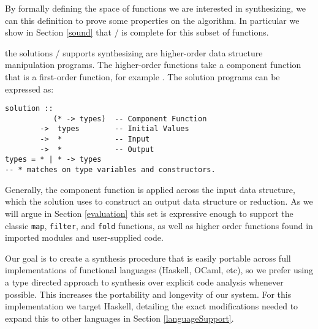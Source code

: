 By formally defining the space of functions we are interested in synthesizing, we can this definition to prove some properties on the algorithm.
In particular we show in Section \ref{sound} that \ourTool/ is complete for this subset of functions.

the solutions \ourTool/ supports synthesizing are higher-order data structure manipulation programs.
The higher-order functions take a component function that is a first-order function, for example \codeinline{(+)}.
The solution programs can be expressed as:

\begin{lstlisting}
solution ::
           (* -> types)  -- Component Function
        ->  types        -- Initial Values
        ->  *            -- Input
        ->  *            -- Output
types = * | * -> types
-- * matches on type variables and constructors.
\end{lstlisting}

Generally, the component function is applied across the \textsf{input} data structure, which the \textsf{solution} uses to construct an \textsf{output} data structure or reduction. As we will argue in Section \ref{evaluation} this set is expressive enough to support the classic \texttt{map}, \texttt{filter}, and \texttt{fold} functions, as well as higher order functions found in imported modules and user-supplied code.

Our goal is to create a synthesis procedure that is easily portable across full implementations of functional languages (Haskell, OCaml, etc), so we prefer using a type directed approach to synthesis over explicit code analysis whenever possible. This increases the portability and longevity of our system. For this implementation we target Haskell, detailing the exact modifications needed to expand this to other languages in Section \ref{languageSupport}.


